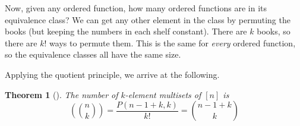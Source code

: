 \documentclass[10pt,]{book}
\theoremstyle{plain}
\newtheorem{theorem}{Theorem}[section]
\theoremstyle{definition}
\theoremstyle{definition}
\theoremstyle{definition}
\numberwithin{equation}{chapter}
\newcommand{\mchoose}[2]{\left(\!\binom{#1}{#2}\!\right)}
\begin{document}
\par
\hypertarget{p-851}{}%
Now, given any ordered function, how many ordered functions are in its equivalence class?  We can get any other element in the class by permuting the books (but keeping the numbers in each shelf constant).  There are \(k\) books, so there are \(k!\) ways to permute them.  This is the same for \emph{every} ordered function, so the equivalence classes all have the same size.%
\par
\hypertarget{p-852}{}%
Applying the quotient principle, we arrive at the following.%
\begin{theorem}[{}]\label{thm-multisetsize}
\hypertarget{p-853}{}%
The number of \(k\)-element multisets of \([n]\) is%
\begin{equation*}
\mchoose{n}{k} = \frac{P(n-1+k, k)}{k!} = \binom{n-1+k}{k}
\end{equation*}
%
\end{theorem}
\typeout{************************************************}
\typeout{************************************************}
\end{document}
